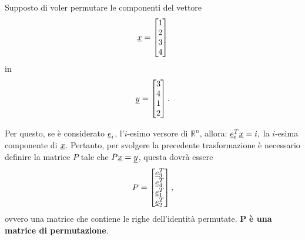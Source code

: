 Supposto di voler permutare le componenti del vettore
\begin{equation*}
        \uline x=
        \begin{bmatrix}
            1\\
            2\\
            3\\
            4
        \end{bmatrix}
\end{equation*}
in
\begin{equation*}
	\uline y=
	\begin{bmatrix}
		3\\
		4\\
		1\\
		2
	\end{bmatrix}.
\end{equation*}

Per questo, se è considerato $\uline e_i$, l'$i$-esimo versore di $\mathbb R^n$, allora: $\uline e_i^T\uline x=i,$ la $i$-esima componente di $\uline x$. Pertanto, per svolgere la precedente trasformazione è necessario definire la matrice $P$ tale che $P\uline x=\uline y$, questa dovrà essere
\begin{equation*}
    P=\begin{bmatrix}
        \uline e_3^T\\
        \uline e_4^T\\
        \uline e_1^T\\
        \uline e_2^T
    \end{bmatrix},
\end{equation*}
ovvero una matrice che contiene le righe dell'identità permutate. $\boldsymbol P$ \textbf{è una matrice di permutazione}.

